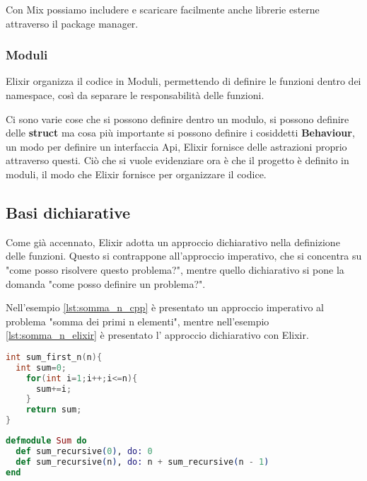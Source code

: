 Con Mix possiamo includere e scaricare facilmente anche librerie esterne attraverso
il package manager.\cite{HexDocs99:online}

\subsubsection{Moduli}
Elixir organizza il codice in Moduli, permettendo di definire
le funzioni dentro dei namespace, così da separare
le responsabilità delle funzioni.

Ci sono varie cose che si possono definire dentro un modulo,
si possono definire delle \textbf{struct}
ma cosa più importante si possono definire i cosiddetti 
\textbf{Behaviour}, un modo per definire un interfaccia Api,
Elixir fornisce delle astrazioni proprio attraverso questi.
Ciò che si vuole evidenziare ora è che il progetto è definito
in moduli, il modo che Elixir fornisce per organizzare il
codice.


\subsection{Basi dichiarative}

Come già accennato, Elixir adotta un approccio
dichiarativo nella definizione delle funzioni.
Questo si contrappone all'approccio imperativo,
che si concentra su "come posso risolvere questo problema?",
mentre quello dichiarativo si pone la domanda 
"come posso definire un problema?".

Nell'esempio \ref{lst:somma_n_cpp} è presentato un approccio
imperativo al problema "somma dei primi n elementi", mentre
nell'esempio \ref{lst:somma_n_elixir} è presentato l' approccio dichiarativo
con Elixir.


\begin{lstlisting}[language=cpp, caption={Somma N elementi},captionpos=b,
	label={lst:somma_n_cpp}]
int sum_first_n(n){
  int sum=0;
    for(int i=1;i++;i<=n){
      sum+=i;
    }
    return sum;
}
\end{lstlisting}

\begin{lstlisting}[language=elixir, caption={Somma N elementi},captionpos=b,
	label={lst:somma_n_elixir}]
defmodule Sum do
  def sum_recursive(0), do: 0
  def sum_recursive(n), do: n + sum_recursive(n - 1)
end
\end{lstlisting}

